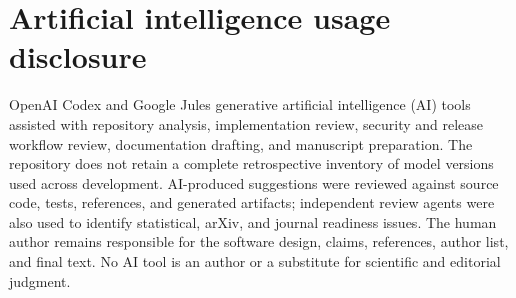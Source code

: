 \section{Artificial intelligence usage disclosure}

OpenAI Codex and Google Jules generative artificial intelligence (AI) tools
assisted with repository analysis, implementation review, security and release
workflow review, documentation drafting, and manuscript preparation. The
repository does not retain a complete retrospective inventory of model
versions used across development. AI-produced suggestions were reviewed
against source code, tests, references, and generated artifacts; independent
review agents were also used to identify statistical, arXiv, and journal
readiness issues. The human author remains responsible for the software
design, claims, references, author list, and final text. No AI tool is an
author or a substitute for scientific and editorial judgment.
